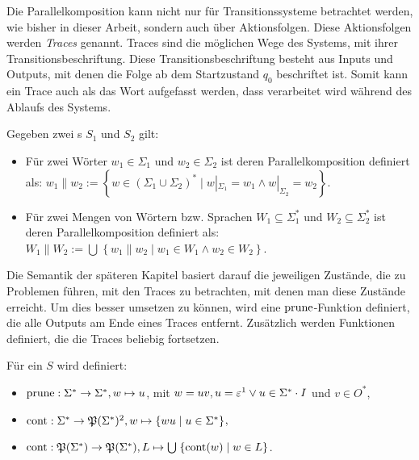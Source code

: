 Die Parallelkomposition kann nicht nur für Transitionssysteme betrachtet
werden, wie bisher in dieser Arbeit, sondern auch über Aktionsfolgen.
Diese Aktionsfolgen werden \emph{Traces} genannt. Traces sind die möglichen Wege des Systems, mit ihrer
Transitionsbeschriftung. Diese Transitionsbeschriftung besteht aus Inputs und
Outputs, mit denen die Folge ab dem Startzustand $q_0$ beschriftet ist. Somit
kann ein Trace auch als das Wort aufgefasst werden, dass verarbeitet wird
während des Ablaufs des Systems.

\begin{Def}
  Gegeben zwei \EIO{}s $S_1$ und $S_2$ gilt:
  \begin{itemize}
    \item Für zwei Wörter $w_1\in\Sigma _1$ und $w_2\in\Sigma _2$ ist
      deren Parallelkomposition definiert als: $w_1\| w_2:=\left\{w\in
      (\Sigma _1\cup\Sigma _2)^*\mid w|_{\Sigma _1}=w_1\wedge w|_{\Sigma
    _2}=w_2\right\}$.
    \item Für zwei Mengen von Wörtern bzw. Sprachen $W_1\subseteq \Sigma
      ^*_1$ und $W_2\subseteq \Sigma ^*_2$ ist deren Parallelkomposition
      definiert als: $W_1\| W_2:=\bigcup\hspace{1pt}\left\{w_1\| w_2\mid
      w_1\in W_1\wedge w_2\in W_2\right\}$.
  \end{itemize}
\end{Def}

Die Semantik der späteren Kapitel basiert darauf die jeweiligen Zustände, die
zu Problemen führen, mit den Traces zu betrachten, mit denen man diese
Zustände erreicht. Um dies besser umsetzen zu können, wird eine
$\mathrm{prune}{}$-Funktion definiert, die alle Outputs am Ende eines Traces entfernt.
Zusätzlich werden Funktionen definiert, die die Traces beliebig fortsetzen.

\begin{Def}
  Für ein \EIO{} $S$ wird definiert:
  \begin{itemize}
    \item $\mathrm{prune}{}:\Sigma ^*\rightarrow\Sigma ^*, w\mapsto u$, mit $w=uv,
      u=\varepsilon\footnotemark\vee u\in\Sigma ^*\cdot I$ und $v\in O^*$,
    \item $\cont{}:\Sigma ^*\rightarrow\mathfrak{P}(\Sigma ^*)\footnotemark,
      w\mapsto\left\{wu\mid u\in\Sigma ^*\right\}$,
    \item $\mathrm{cont}{}:\mathfrak{P}(\Sigma ^*)\rightarrow\mathfrak{P}(\Sigma ^*),
      L\mapsto\bigcup\hspace{1pt}\left\{\mathrm{cont}{}(w)\mid w\in L\right\}$.
  \end{itemize}
\end{Def}

